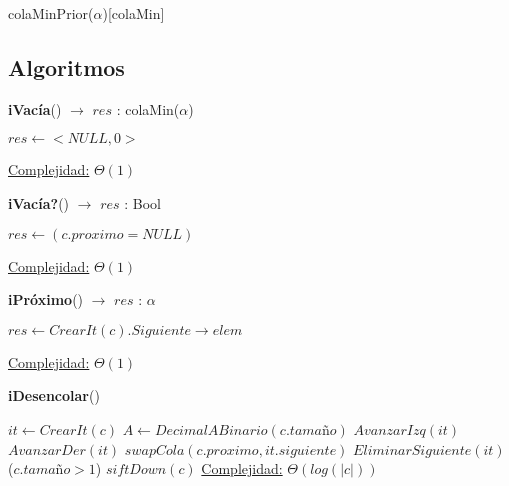 \begin{Estructura}{colaMinPrior($\alpha$)}[colaMin]
\subsection{Algoritmos}
	\lstset{style=alg}

\begin{algorithm}[H]{\textbf{iVacía}() $\to$ $res$ : colaMin($\alpha$)}
    	\begin{algorithmic}[1]
			\State $res \gets <NULL, 0>$ 
			
			\medskip
			\Statex \underline{Complejidad:} $\Theta(1)$
    	\end{algorithmic}
\end{algorithm}

\begin{algorithm}[H]{\textbf{iVacía?}() $\to$ $res$ : Bool}
    	\begin{algorithmic}[1]
			\State $res \gets (c.proximo = NULL)$ 
			
			\medskip
			\Statex \underline{Complejidad:} $\Theta(1)$
    	\end{algorithmic}
\end{algorithm}

\begin{algorithm}[H]{\textbf{iPróximo}() $\to$ $res$ : $\alpha$}
    	\begin{algorithmic}[1]
			\State $res \gets CrearIt(c).Siguiente \rightarrow elem$ 
			
			\medskip
			\Statex \underline{Complejidad:} $\Theta(1)$
    	\end{algorithmic}
\end{algorithm}

\begin{algorithm}[H]{\textbf{iDesencolar}()}
    	\begin{algorithmic}[1]
			\State $it \leftarrow CrearIt(c) $ 
			\State $A \leftarrow DecimalABinario(c.tamaño) $ 
			 
					\State $AvanzarIzq(it) $ 
				\Else
					\State $AvanzarDer(it) $ 
				\EndIf
			\EndFor
			\State $swapCola(c.proximo, it.siguiente) $ 
			\State $EliminarSiguiente(it) $ 
			\If($c.tamaño > 1$)
				\State $siftDown(c) $ 
			\EndIf
			\medskip
			\Statex \underline{Complejidad:} $\Theta(log(|c|))$
    	\end{algorithmic}
\end{algorithm}


\end{Estructura}
